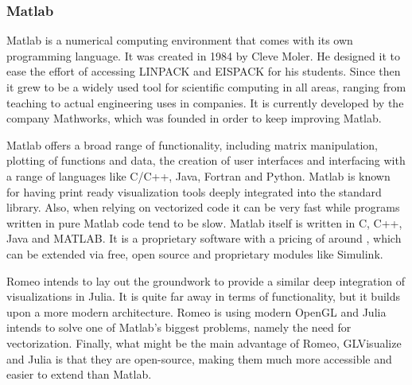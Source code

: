 \subsubsection{Matlab}

\ac{Matlab} is a numerical computing environment that comes with its own programming language.
It was created in 1984 by Cleve Moler. He designed it to ease the effort of accessing LINPACK and EISPACK for his students.
Since then it grew to be a widely used tool for scientific computing in all areas, ranging from teaching to actual engineering uses in companies. It is currently developed by the company Mathworks, which was founded in order to keep improving Matlab.

Matlab offers a broad range of functionality, including matrix manipulation, plotting of functions and data, the creation of user interfaces and interfacing with a range of languages like C/C++, Java, Fortran and Python. 
Matlab is known for having print ready visualization tools deeply integrated into the standard library.
Also, when relying on vectorized code it can be very fast while programs written in pure Matlab code tend to be slow.
\ac{Matlab} itself is written in C, C++, Java and MATLAB.
It is a proprietary software with a pricing of around \cite{MatlabPricing}, which can be extended via free, open source and proprietary modules like Simulink.

Romeo intends to lay out the groundwork to provide a similar deep integration of visualizations in Julia. 
It is quite far away in terms of functionality, but it builds upon a more modern architecture.
Romeo is using modern OpenGL and Julia intends to solve one of Matlab's biggest problems, namely the need for vectorization.
Finally, what might be the main advantage of Romeo, GLVisualize and Julia is that they are open-source, making them much more accessible and easier to extend than Matlab.


